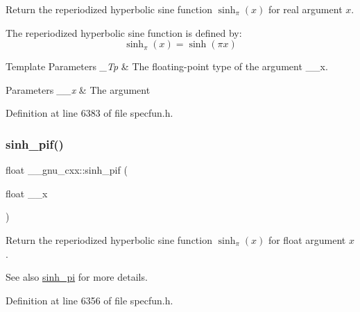 Return the reperiodized hyperbolic sine function $ \sinh_\pi(x) $ for real argument $ x $.

The reperiodized hyperbolic sine function is defined by\+: \[ \sinh_\pi(x) = \sinh(\pi x) \]


\begin{DoxyTemplParams}{Template Parameters}
{\em \+\_\+\+Tp} & The floating-\/point type of the argument {\ttfamily \+\_\+\+\_\+x}. \\
\hline
\end{DoxyTemplParams}

\begin{DoxyParams}{Parameters}
{\em \+\_\+\+\_\+x} & The argument \\
\hline
\end{DoxyParams}


Definition at line 6383 of file specfun.\+h.

\mbox{\label{group__gnu__math__spec__func_ga74103f57ab0d97126732f3cb276c5ab3}} 
\subsubsection{\texorpdfstring{sinh\+\_\+pif()}{sinh\_pif()}}
{\footnotesize\ttfamily float \+\_\+\+\_\+gnu\+\_\+cxx\+::sinh\+\_\+pif (\begin{DoxyParamCaption}\item[{float}]{\+\_\+\+\_\+x }\end{DoxyParamCaption})\hspace{0.3cm}{\ttfamily [inline]}}

Return the reperiodized hyperbolic sine function $ \sinh_\pi(x) $ for {\ttfamily float} argument $ x $.

\begin{DoxySeeAlso}{See also}
\hyperlink{group__gnu__math__spec__func_gade43453b87b6b38c05b3fcce40870542}{sinh\+\_\+pi} for more details. 
\end{DoxySeeAlso}


Definition at line 6356 of file specfun.\+h.

\mbox{\label{group__gnu__math__spec__func_ga2232ee554ef2a902824db42e2e09c483}} 
